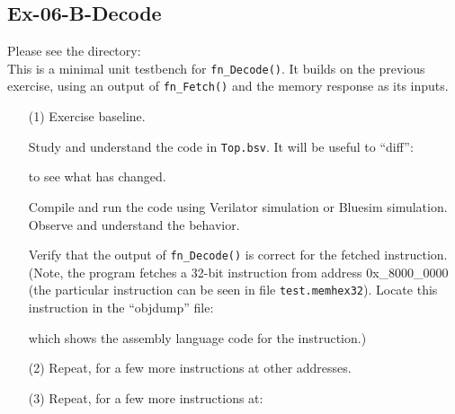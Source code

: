 
\subsection*{Ex-06-B-Decode}

\label{Ex-06-B-Decode}

Please see the directory:  \\
This is a minimal unit testbench for \verb|fn_Decode()|.  It builds on
the previous exercise, using an output of \verb|fn_Fetch()| and the
memory response as its inputs.

\begin{itemize}

\item[(1)] Exercise baseline.

    Study and understand the code in \verb|Top.bsv|.  It will be
    useful to ``diff'':
    to see what has changed.

    Compile and run the code using Verilator simulation or Bluesim
    simulation.  Observe and understand the behavior.

    Verify that the output of \verb|fn_Decode()| is correct for the
    fetched instruction.  (Note, the program fetches a 32-bit
    instruction from address 0x\_8000\_0000 (the particular
    instruction can be seen in file \verb|test.memhex32|).  Locate
    this instruction in the ``objdump'' file:


    which shows the assembly language code for the instruction.)

\item[(2)] Repeat, for a few more instructions at other addresses.

\item[(3)] Repeat, for a few more instructions at:


\end{itemize}
